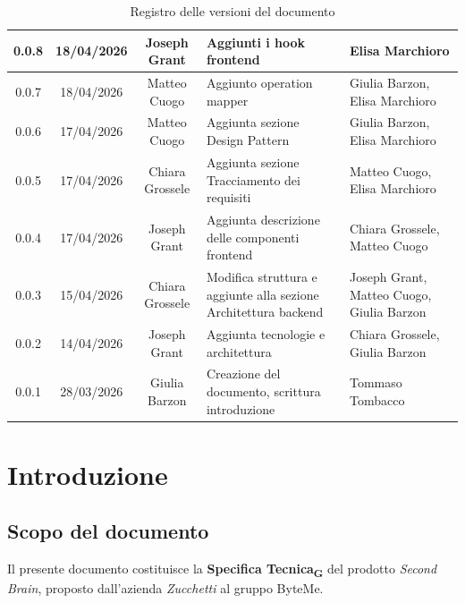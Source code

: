 \documentclass[11pt,a4paper]{article}
\newcommand{\gls}[1]{#1\textsubscript{G}}
\begin{document}
\begin{table}[H]
\begin{tabular}{|c|c|c|>{\raggedright\arraybackslash}p{}|p{}|}
        \hline
        0.0.8 & 18/04/2026 & Joseph Grant & Aggiunti i hook frontend & Elisa Marchioro\\
        \hline
        0.0.7 & 18/04/2026 & Matteo Cuogo & Aggiunto operation mapper & Giulia Barzon, Elisa Marchioro\\
        \hline
        0.0.6 & 17/04/2026 & Matteo Cuogo & Aggiunta sezione Design Pattern & Giulia Barzon, Elisa Marchioro\\
        \hline
        0.0.5 & 17/04/2026 & Chiara Grossele & Aggiunta sezione Tracciamento dei requisiti & Matteo Cuogo, Elisa Marchioro\\
        \hline
        0.0.4 & 17/04/2026 & Joseph Grant & Aggiunta descrizione delle componenti frontend & Chiara Grossele, Matteo Cuogo\\
        \hline
        0.0.3 & 15/04/2026 & Chiara Grossele & Modifica struttura e aggiunte alla sezione Architettura backend & Joseph Grant, Matteo Cuogo, Giulia Barzon \\
        \hline
        0.0.2 & 14/04/2026 & Joseph Grant & Aggiunta tecnologie e architettura & Chiara Grossele, Giulia Barzon\\
        \hline
        0.0.1 & 28/03/2026 & Giulia Barzon & Creazione del documento, scrittura introduzione & Tommaso Tombacco \\
        \hline
    \end{tabular}
    \caption{Registro delle versioni del documento}
    \label{tab:versionamento}
\end{table}
\newpage

\tableofcontents
\thispagestyle{empty}
\newpage

\setcounter{page}{1}

\section{Introduzione}
\subsection{Scopo del documento}
Il presente documento costituisce la \textbf{\gls{Specifica Tecnica}} del prodotto \textit{Second Brain}, proposto dall'azienda \textit{Zucchetti} al gruppo ByteMe.
 
\end{document}
